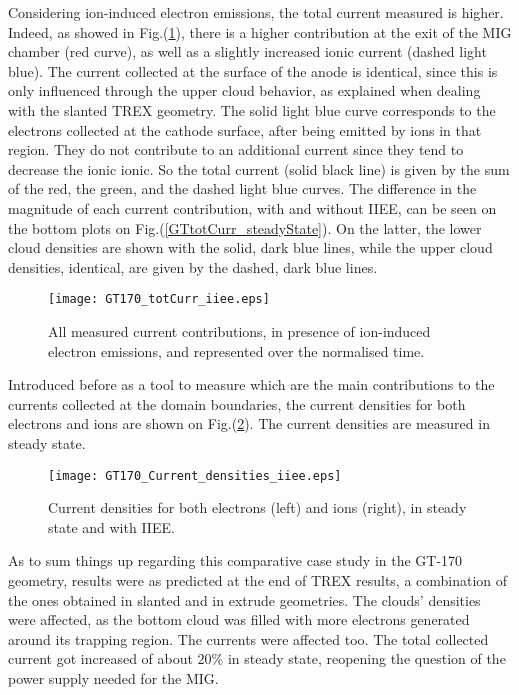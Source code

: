 \noindent Considering ion-induced electron emissions, the total current measured is higher. Indeed, as showed in Fig.(\ref{GTtotCurr_iiee}), there is a higher contribution at the exit of the MIG chamber (red curve), as well as a slightly increased ionic current (dashed light blue). The current collected at the surface of the anode is identical, since this is only influenced through the upper cloud behavior, as explained when dealing with the slanted TREX geometry. The solid light blue curve corresponds to the electrons collected at the cathode surface, after being emitted by ions in that region. They do not contribute to an additional current since they tend to decrease the ionic ionic. So the total current (solid black line) is given by the sum of the red, the green, and the dashed light blue curves. The difference in the magnitude of each current contribution, with and without IIEE, can be seen on the bottom plots on Fig.(\ref{GTtotCurr_steadyState}). On the latter, the lower cloud densities are shown with the solid, dark blue lines, while the upper cloud densities, identical, are given by the dashed, dark blue lines.\\

 
\begin{figure}[h!]
\centering
	\texttt{[image: GT170\_totCurr\_iiee.eps]}
	\caption{\label{GTtotCurr_iiee} All measured current contributions, in presence of ion-induced electron emissions, and represented over the normalised time.}
\end{figure}

\noindent Introduced before as a tool to measure which are the main contributions to the currents collected at the domain boundaries, the current densities for both electrons and ions are shown on Fig.(\ref{GT170_CurrDens}). The current densities are measured in steady state.  

\begin{figure}[h!]
\centering
	\texttt{[image: GT170\_Current\_densities\_iiee.eps]}
	\caption{\label{GT170_CurrDens} Current densities for both electrons (left) and ions (right), in steady state and with IIEE.}
\end{figure}

As to sum things up regarding this comparative case study in the GT-170 geometry, results were as predicted at the end of TREX results, a combination of the ones obtained in slanted and in extrude geometries. The clouds' densities were affected, as the bottom cloud was filled with more electrons generated around its trapping region. The currents were affected too. The total collected current got increased of about $20\%$ in steady state, reopening the question of the power supply needed for the MIG.\\

